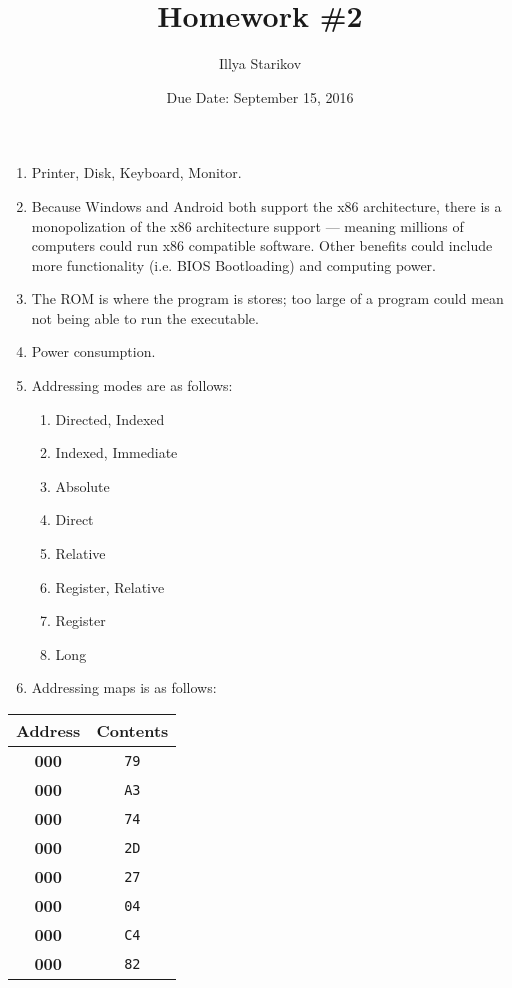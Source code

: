\documentclass{article}
\title{Homework \#2}
\date{Due Date: September 15, 2016}
\author{Illya Starikov}
\newcounter{map}
\newcommand{\address}{
    \textbf{000\themap}
    \addtocounter{map}{1}
}
\newcommand{\contents}[1]{
    \texttt{#1}
}
\begin{document}
\maketitle

\begin{enumerate}
    \item Printer, Disk, Keyboard, Monitor.

    \item Because Windows and Android both support the x86 architecture, there is a monopolization of the x86 architecture support --- meaning millions of computers could run x86 compatible software. Other benefits could include more functionality (i.e. BIOS Bootloading) and computing power.

    \item The ROM is where the program is stores; too large of a program could mean not being able to run the executable.

    \item Power consumption.

    \item Addressing modes are as follows:
    \begin{enumerate}
        \item Directed, Indexed
        \item Indexed, Immediate
        \item Absolute
        \item Direct
        \item Relative
        \item Register, Relative
        \item Register
        \item Long
    \end{enumerate}

    \item Addressing maps is as follows:
\end{enumerate}

\begin{center}
    \begin{tabular}{|c|c|}
        \hline
        \textbf{Address} & \textbf{Contents} \\ \hline
        \address & \contents{79} \\ \hline
        \address & \contents{A3} \\ \hline
        \address & \contents{74} \\ \hline
        \address & \contents{2D} \\ \hline
        \address & \contents{27} \\ \hline
        \address & \contents{04} \\ \hline
        \address & \contents{C4} \\ \hline
        \address & \contents{82} \\ \hline
    \end{tabular}
\end{center}
\end{document}
